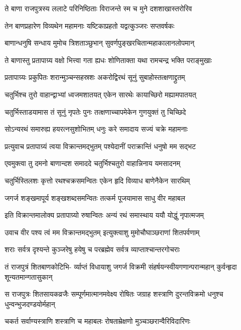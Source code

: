 \twolineshloka
{ते बाणा राजपुत्रस्य ललाटे परिनिष्ठिताः}
{विराजन्ते स्म च मुने दशशाखास्तरोरिव}%

\twolineshloka
{तेन बाणप्रहारेण विव्यथेन महामनाः}
{यष्टिकाप्रहतो यद्वत्कुञ्जरः सप्तवर्षकः}%

\twolineshloka
{बाणान्धनुषि सन्धाय मुमोच त्रिशताञ्छुभान्}
{सुवर्णपुङ्खरचितान्महाकालानलोपमान्}%

\twolineshloka
{ते बाणास्तु प्रतापाग्र्य वक्षो भित्त्वा गता ह्यधः}
{शोणिताक्ता यथा रामचन्द्र भक्ति पराङ्मुखाः}%

\twolineshloka
{प्रतापाग्र्यः प्रकुपितः शरान्मुञ्चन्सहस्रशः}
{अकरोद्विरथं सूनुं सुबाहोस्तत्क्षणाद्द्रुतम्}%

\twolineshloka
{चतुर्भिश्च तुरो वाहान्द्वाभ्यां ध्वजमशातयत्}
{एकेन सारथेः कायाच्छिरो मह्यामपातयत्}%

\twolineshloka
{चतुर्भिस्ताडयामास तं सूनुं नृपतेः पुनः}
{तत्क्षणाच्चापमेकेन गुणयुक्तं तु चिच्छिदे}%

\twolineshloka
{सोऽन्यरथं समारुह्य हयरत्नसुशोभितम्}
{धनुः करे समादाय सज्यं चक्रे महामनाः}%

\twolineshloka
{प्रत्युवाच प्रतापाग्र्यं त्वया विक्रान्तमद्भुतम्}
{पश्येदानीं पराक्रान्तिं धनुषो मम सद्भट}%

\twolineshloka
{एवमुक्त्वा तु दमनो बाणान्दश समाददे}
{चतुर्भिश्चतुरो वाहान्निनाय यमसादनम्}%

\twolineshloka
{चतुर्भिस्तिलशः कृत्तो रथश्चक्रसमन्वितः}
{एकेन हृदि विव्याध बाणेनैकेन सारथिम्}%

\twolineshloka
{जगर्ज शङ्खमापूर्य शङ्खशब्दसमन्वितः}
{तत्कर्म पूजयामास साधु वीर महाबल}%

\twolineshloka
{इति विक्रान्तमालोक्य प्रतापाग्र्यो रुषान्वितः}
{अन्यं रथं समास्थाय ययौ योद्धुं नृपात्मजम्}%

\twolineshloka
{उवाच वीर पश्य त्वं मम विक्रान्तमद्भुतम्}
{इत्युक्त्वाशु मुमोचौघाञ्छराणां शितपर्वणाम्}%

\twolineshloka
{शराः सर्वत्र दृश्यन्ते कुञ्जरेषु हयेषु च}
{परब्रह्मेव सर्वत्र व्याप्ताश्चान्तरगोचराः}%

\fourlineindentedshloka
{तं राजपुत्रं शितबाणकोटिभि-}
{र्व्याप्तं विधायाशु जगर्ज विक्रमी}
{संहर्षयन्स्वीयगणान्परान्महान्}
{कुर्वन्हृदा शून्यतमान्गतासुकान्}%

\fourlineindentedshloka
{स राजपुत्रः शितसायकव्रजैः}
{सम्पूर्णमात्मानमवेक्ष्य रोषितः}
{जग्राह शस्त्राणि दुरन्तविक्रमो}
{धनुश्च धुन्वन्भुजदण्डयोर्महान्}%

\twolineshloka
{चकर्त सर्वाण्यस्त्राणि शस्त्राणि च महाबलः}
{रोषताम्रेक्षणो मुञ्चञ्छरान्वैरिविदारिणः}%

